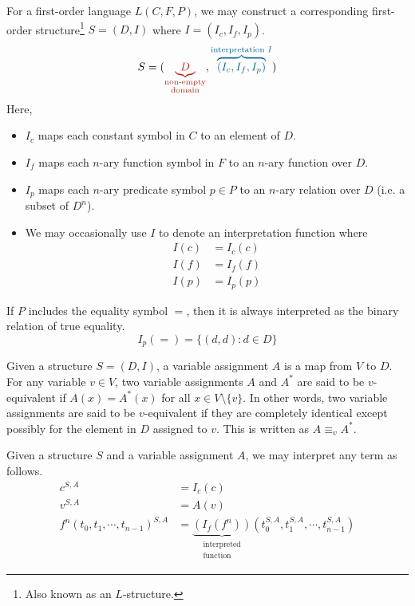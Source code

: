 For a first-order language \(L(C, F, P)\), we may construct a corresponding first-order structure\footnote{Also known as an \(L\)-structure.} \(S = (D, I)\) where \(I = (I_c, I_f, I_p)\).
%
{\large
    \[
        S = (
            {\color{BrickRed}
                \underbrace{D}_{\substack{
                    \text{non-empty}\\
                    \text{domain}
                }}
            }
            ,
            {\color{MidnightBlue}
                \overbrace{(
                    I_c,
                    I_f,
                    I_p
                )}^{\text{interpretation } I}
            }
        )
    \]
}
%
Here,
\begin{itemize}
    \item \(I_c\) maps each constant symbol in \(C\) to an element of \(D\).
    \item \(I_f\) maps each \(n\)-ary function symbol in \(F\) to an \(n\)-ary function over \(D\).
    \item \(I_p\) maps each \(n\)-ary predicate symbol \(p \in P\) to an \(n\)-ary relation over \(D\) (i.e. a subset of \(D^n\)).
    \item We may occasionally use \(I\) to denote an interpretation function where
    \begin{align*}
        I(c) &= I_c (c) \tag{for all \(c \in C\)}\\
        I(f) &= I_f (f) \tag{for all \(f \in F\)}\\
        I(p) &= I_p (p) \tag{for all \(p \in P\)}
    \end{align*}
\end{itemize}

If \(P\) includes the equality symbol \(=\), then it is always interpreted as the binary relation of true equality.
%
\[I_p (=) = \{(d, d) : d \in D\}\]

Given a structure \(S = (D, I)\), a variable assignment \(A\) is a map from \(V\) to \(D\). For any variable \(v \in V\), two variable assignments \(A\) and \(A^{*}\) are said to be \(v\)-equivalent if \(A(x) = A^{*}(x)\) for all \(x \in V \setminus \{v\}\). In other words, two variable assignments are said to be \(v\)-equivalent if they are completely identical except possibly for the element in \(D\) assigned to \(v\). This is written as \(A \equiv_v A^{*}\).

Given a structure \(S\) and a variable assignment \(A\), we may interpret any term as follows.
%
\begin{align*}
    c^{S, A} &= I_c (c)\\
    v^{S, A} &= A(v)\\
    f^n (t_0, t_1, \cdots, t_{n-1})^{S, A} &= \underbrace{(I_f (f^n))}_{\substack{\text{interpreted}\\\text{function}}} (t_0^{S, A}, t_1^{S, A}, \cdots, t_{n-1}^{S, A})
\end{align*}

